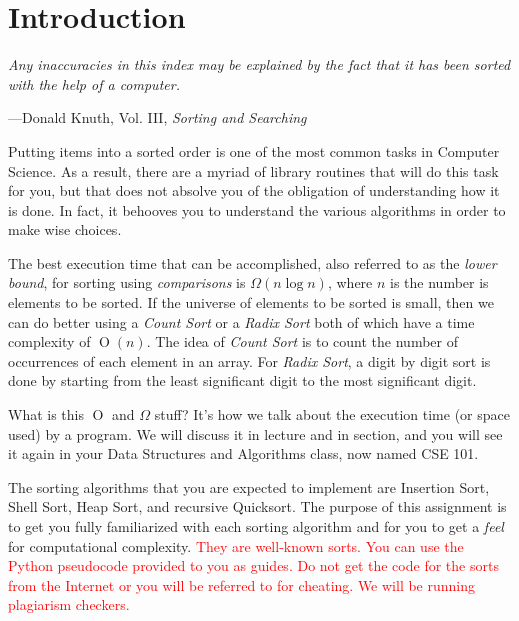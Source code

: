 \section{Introduction}

\textwidth
\epigraph{\emph{Any inaccuracies in this index may be explained by the
fact that it has been sorted with the help of a computer.}}{---Donald
Knuth, Vol.  III, \emph{Sorting and Searching}}

\noindent Putting items into a sorted order is one of the most common
tasks in Computer Science. As a result, there are a myriad of library
routines that will do this task for you, but that does not absolve you
of the obligation of understanding how it is done. In fact, it behooves
you to understand the various algorithms in order to make wise choices.

The best execution time that can be accomplished, also referred to as
the \emph{lower bound}, for sorting using \emph{comparisons} is
$\Omega(n \log n)$, where $n$ is the number is elements to be sorted. If
the universe of elements to be sorted is small, then we can do better
using a \emph{Count Sort} or a \emph{Radix Sort} both of which have a
time complexity of $\operatorname{O}(n)$. The idea of \emph{Count Sort}
is to count the number of occurrences of each element in an array. For
\emph{Radix Sort}, a digit by digit sort is done by starting from the
least significant digit to the most significant digit.

What is this $\operatorname{O}$ and $\Omega$ stuff? It's how we talk
about the execution time (or space used) by a program. We will discuss
it in lecture and in section, and you will see it again in your Data
Structures and Algorithms class, now named CSE 101.

The sorting algorithms that you are expected to implement are Insertion
Sort, Shell Sort, Heap Sort, and recursive Quicksort. The purpose of
this assignment is to get you fully familiarized with each sorting
algorithm and for you to get a \emph{feel} for computational complexity.
\textcolor{red}{They are well-known sorts. You can use the Python
pseudocode provided to you as guides. Do not get the code for the sorts
from the Internet or you will be referred to for cheating. We will be
running plagiarism checkers.}
